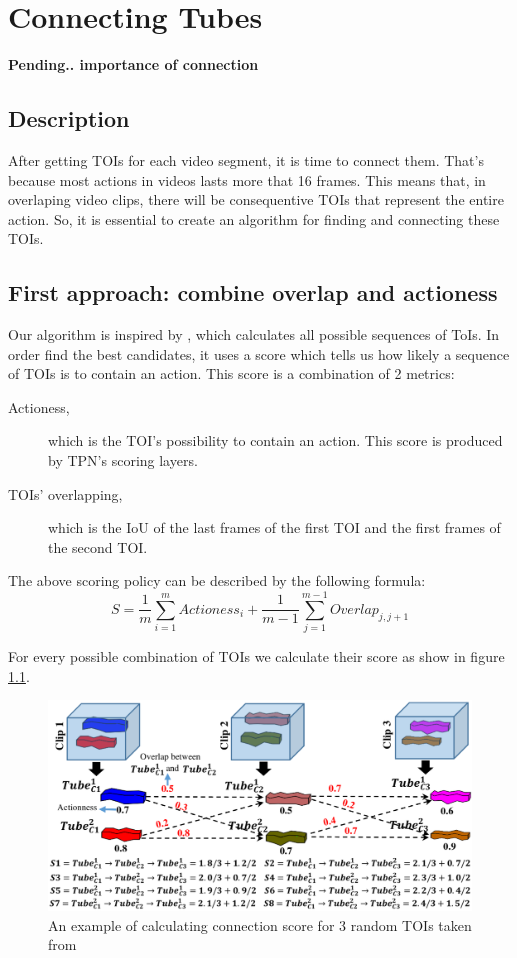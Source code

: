 \documentclass{report}
\begin{document}
\chapter{Connecting Tubes}
\textbf{Pending.. importance of connection}
\section{Description}
After getting TOIs for each video segment, it is time to connect them. That's because most actions in videos lasts more that 16 frames.
This means that, in overlaping video clips, there will be consequentive TOIs that represent the entire action. So, it is essential to create
an algorithm for finding and connecting these TOIs.

\section{First approach: combine overlap and actioness}
Our algorithm is inspired by \cite{DBLP:journals/corr/HouCS17}, which calculates all possible sequences of ToIs. In order find the best candidates,
it uses a score which tells us how likely a sequence of TOIs is  to contain an action. This score is a combination of 2 metrics:
\begin{description}
\item[ Actioness,  ] which is the TOI's possibility to contain an action. This score is produced by TPN's scoring layers.
\item [ TOIs' overlapping, ] which is the IoU of the last frames of the first TOI and the first frames of the second TOI.
\end{description}

The above scoring policy can be described by the following formula:
\[ S = \frac{1}{m} \sum_ {i=1}^{m} Actioness_i + \frac{1}{m-1} \sum_{j=1}^{m-1} Overlap_{j,j+1} \]

For every possible combination of TOIs we calculate their score as show in figure \ref{fig:connection_algo}.

\begin{figure}[h]
  \centering
  \includegraphics[scale=0.225]{connection_algo}
  \caption{An example of calculating connection score for 3 random TOIs taken from \cite{DBLP:journals/corr/HouCS17}}
  \label{fig:connection_algo}
\end{figure}
\end{document}
